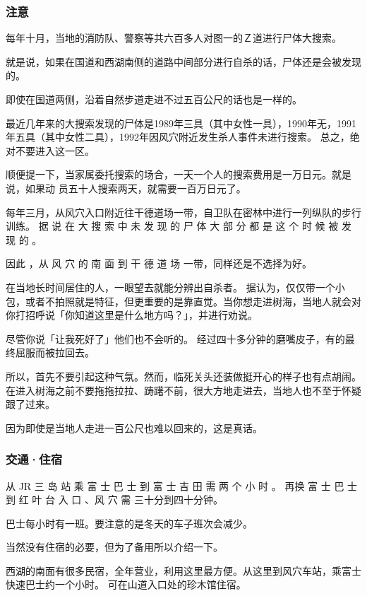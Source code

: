 \documentclass[UTF8]{ctexart}
\begin{document}
\subsubsection{注意}

每年十月，当地的消防队、警察等共六百多人对图一的Ｚ道进行尸体大搜索。

就是说，如果在国道和西湖南侧的道路中间部分进行自杀的话，尸体还是会被发现的。

即使在国道两侧，沿着自然步道走进不过五百公尺的话也是一样的。

最近几年来的大搜索发现的尸体是1989年三具（其中女性一具），1990年无，1991年五具（其中女性二具），1992年因风穴附近发生杀人事件未进行搜索。
总之，绝对不要进入这一区。

顺便提一下，当家属委托搜索的场合，一天一个人的搜索费用是一万日元。就是说，如果动
员五十人搜索两天，就需要一百万日元了。

每年三月，从风穴入口附近往干德道场一带，自卫队在密林中进行一列纵队的步行训练。
据 说 在 大 搜 索 中 未 发 现 的 尸 体 大 部 分 都 是 这 个 时 候 被 发 现 的 。

因此 ，从 风 穴 的 南 面 到 干 德 道 场 一带，同样还是不选择为好。

在当地长时间居住的人，一眼望去就能分辨出自杀者。
据认为，仅仅带一个小包，或者不拍照就是特征，但更重要的是靠直觉。当你想走进树海，当地人就会对你打招呼说「你知道这里是什么地方吗？」，并进行劝说。

尽管你说「让我死好了」他们也不会听的。
经过四十多分钟的磨嘴皮子，有的最终屈服而被拉回去。

所以，首先不要引起这种气氛。然而，临死关头还装做挺开心的样子也有点胡闹。
在进入树海之前不要拖拖拉拉、踌躇不前，很大方地走进去，当地人也不至于怀疑跟了过来。

因为即使是当地人走进一百公尺也难以回来的，这是真话。

\subsubsection{交通·住宿}

从 JR  三 岛 站 乘 富 士 巴 士 到 富 士 吉 田 需 两 个 小 时 。
再换 富 士 巴 士 到 红 叶 台 入 口 、风 穴 需 三十分到四十分钟。

巴士每小时有一班。要注意的是冬天的车子班次会减少。

当然没有住宿的必要，但为了备用所以介绍一下。

西湖的南面有很多民宿，全年营业，利用这里最方便。从这里到风穴车站，乘富士快速巴士约一个小时。
可在山道入口处的珍木馆住宿。
\end{document}
